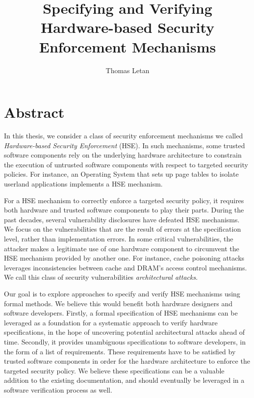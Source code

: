 \documentclass{article}
\title{Specifying and Verifying Hardware-based Security Enforcement Mechanisms}
\author{Thomas Letan}
\date{}
\begin{document}
\maketitle

\section{Abstract}

In this thesis, we consider a class of security enforcement mechanisms we called
\emph{Hardware-based Security Enforcement} (HSE).
%
In such mechanisms, some trusted software components rely on the underlying
hardware architecture to constrain the execution of untrusted software
components with respect to targeted security policies.
%
For instance, an Operating System that sets up page tables to isolate userland
applications implements a HSE mechanism.

For a HSE mechanism to correctly enforce a targeted security policy, it requires
both hardware and trusted software components to play their parts.
%
During the past decades, several vulnerability disclosures have defeated HSE
mechanisms.
%
We focus on the vulnerabilities that are the result of errors at the
specification level, rather than implementation errors.
%
In some critical vulnerabilities, the attacker makes a legitimate use of one
hardware component to circumvent the HSE mechanism provided by another one.
%
For instance, cache poisoning attacks leverages inconsistencies between cache
and DRAM's access control mechanisms.
%
We call this class of security vulnerabilities \emph{architectural attacks}.

Our goal is to explore approaches to specify and verify HSE mechanisms using
formal methods.
%
We believe this would benefit both hardware designers and software developers.
%
Firstly, a formal specification of HSE mechanisms can be leveraged as a
foundation for a systematic approach to verify hardware specifications, in the
hope of uncovering potential architectural attacks ahead of time.
%
Secondly, it provides unambiguous specifications to software developers, in the
form of a list of requirements.
%
These requirements have to be satisfied by trusted software components in order
for the hardware architecture to enforce the targeted security policy.
%
We believe these specifications can be a valuable addition to the existing
documentation, and should eventually be leveraged in a software verification
process as well.
%
\end{document}
